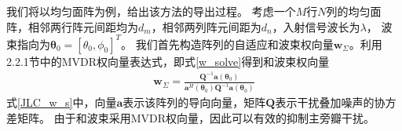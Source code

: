 \documentclass[master]{thesis-uestc}
\begin{document}
我们将以均匀面阵为例，给出该方法的导出过程。
考虑一个$M$行$N$列的均匀面阵，相邻两行阵元间距均为$d_m$，相邻两列阵元间距为$d_n$，入射信号波长为$\lambda$，
波束指向为$\bm{\theta}_0=\left[\theta_0,\phi_0\right]^T$。
我们首先构造阵列的自适应和波束权向量$\bm{w}_\Sigma$。利用2.2.1节中的MVDR权向量表达式，即式\eqref{w_solve}得到和波束权向量
\begin{equation}\label{JLC_w_s}
    \begin{aligned}
        \bm{w}_\Sigma = \frac{\bm{Q}^{-1}\bm{a}(\bm{\theta}_0)}{\bm{a}^H(\bm{\theta}_0)\bm{Q}^{-1}\bm{a}(\bm{\theta}_0)}
    \end{aligned}
\end{equation}
式\eqref{JLC_w_s}中，向量$\bm{a}$表示该阵列的导向向量，矩阵$\bm{Q}$表示干扰叠加噪声的协方差矩阵。
由于和波束采用MVDR权向量，因此可以有效的抑制主旁瓣干扰。
\end{document}
